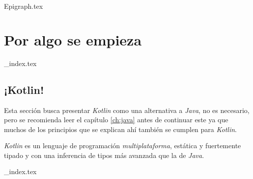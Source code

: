 {Epigraph.tex}
\part{Por algo se empieza}
  {_index.tex}
  
  \chapter{¡Kotlin!}
    Esta sección busca presentar \textit{Kotlin} como una alternativa a \textit{Java}, no es 
    necesario, pero se recomienda leer el capítulo \ref{ch:java} antes de continuar este ya que 
    muchos de los principios que se explican ahí también se cumplen para \textit{Kotlin}.
    
    \textit{Kotlin} es un lenguaje de programación \textit{multiplataforma}, estática y fuertemente 
    tipado y con una inferencia de tipos más avanzada que la de \textit{Java}.
  
  {_index.tex}
